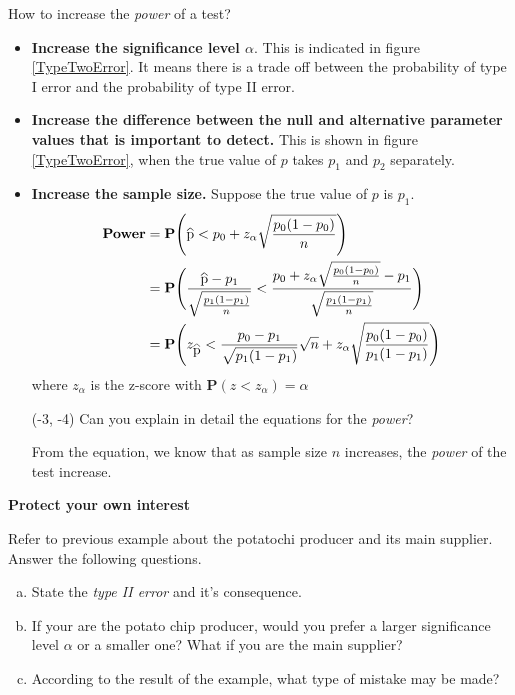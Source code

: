 \documentclass[a4paper, 12pt,twoside]{book}
\newcommand\reallywidehat[1]{%
\savestack{\tmpbox}{\stretchto{%
  \scaleto{%
    \scalerel*[\widthof{\ensuremath{#1}}]{\kern-.6pt\bigwedge\kern-.6pt}%
    {\rule[-\textheight/2]{1ex}{\textheight}}%
  }{\textheight}%
}{0.5ex}}%
\stackon[1pt]{#1}{\tmpbox}%
}
\begin{document}
How to increase the \textit{power} of a test?
    \begin{itemize}
       \item \textbf{Increase the significance level $\alpha$}\vspace{0.3cm}. This is indicated in figure \ref{TypeTwoError}. It means there is a trade off between the probability of type I error and the probability of type II error.
       \item \textbf{Increase the difference between the null and alternative parameter values that is important to detect.} This is shown in figure \ref{TypeTwoError}, when the true value of $p$ takes $p_1$ and $p_2$ separately.
       \item \textbf{Increase the sample size.} Suppose the true value of $p$ is $p_1$.
          \begin{equation*}
             \begin{split}
             \textbf{Power}&=\textbf{P}\Bigg(\reallywidehat{p} < p_0 + z_{\alpha}\sqrt{\frac{p_0(1-p_0)}{n}}\Bigg)\\
             &= \textbf{P}\Bigg(\frac{\reallywidehat{p}-p_1}{\sqrt{\frac{p_1(1-p_1)}{n}}} < \frac{p_0 + z_{\alpha}\sqrt{\frac{p_0(1-p_0)}{n}} - p_1}{\sqrt{\frac{p_1(1-p_1)}{n}}}\Bigg)\\    
             &= \textbf{P} \Bigg(z_{\reallywidehat{p}} < \frac{p_0-p_1}{\sqrt{p_1(1-p_1)}}\sqrt{n} + z_{\alpha}\sqrt{\frac{p_0(1-p_0)}{p_1(1-p_1)}}\Bigg)      
             \end{split}
          \end{equation*}
  where $z_{\alpha}$ is the z-score with $\textbf{P}(z<z_{\alpha}) = \alpha$
  
  \begin{textblock}{4}(-3, -4)
  Can you explain in detail the equations for the \textit{power}?
  \end{textblock}
  
  From the equation, we know that as sample size $n$ increases, the \textit{power} of the test increase. 
    \end{itemize}
\newpage
\colorbox{champagne}{\parbox{\textwidth}{
\textbf{Protect your own interest}\vspace{0.3cm}

Refer to previous example about the potatochi producer and its main supplier. Answer the following questions.
\begin{enumerate}[(a)]
    \item State the \textit{type II error} and it's consequence.
    \item If your are the potato chip producer, would you prefer a larger significance level $\alpha$ or a smaller one?
    What if you are the main supplier?
    \item According to the result of the example, what type of mistake may be made?
\end{enumerate}
}}
\end{document}
